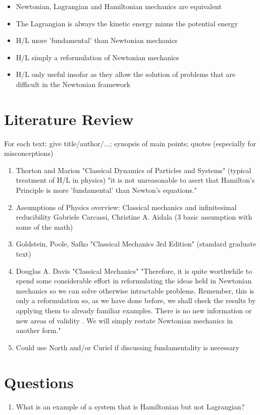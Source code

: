 \documentclass{article}
\begin{document}
\begin{itemize}
	\item Newtonian, Lagrangian and Hamiltonian mechanics are equivalent
	\item The Lagrangian is always the kinetic energy minus the potential energy 
	\item H/L more 'fundamental' than Newtonian mechanics
	\item H/L simply a reformulation of Newtonian mechanics
	\item H/L only useful insofar as they allow the solution of problems that are difficult in the Newtonian framework
\end{itemize}

\section{Literature Review}
For each text: give title/author/...; synopsis of main points; quotes (especially for misconceptions)

\begin{enumerate}
\item Thorton and Marion "Classical Dynamics of Particles and Systems"
(typical treatment of H/L in physics)
"it is not unreasonable to asert that Hamilton's Principle is more 'fundamental' than Newton's equations."
\item Assumptions of Physics overview:
Classical mechanics and infinitesimal reducibility
Gabriele Carcassi, Christine A. Aidala (3 basic assumption with some of the math)
\item Goldstein, Poole, Safko "Classical Mechanics 3rd Edition"
(standard graduate text)
\item Douglas A. Davis "Classical Mechanics"
"Therefore, it is quite worthwhile to spend some considerable effort in reformulating the ideas held in Newtonian mechanics so we can solve otherwise intractable problems. Remember, this is only a reformulation so, as we have done before, we shall check the results by applying them to already familiar examples. There is no new information or new areas of validity . We will simply restate Newtonian mechanics in another form."
\item Could use North and/or Curiel if discussing fundamentality is necessary

\end{enumerate}
\section{Questions}
\begin{enumerate}
\item What is an example of a system that is Hamiltonian but not Lagrangian?
\end{enumerate}
\end{document}
